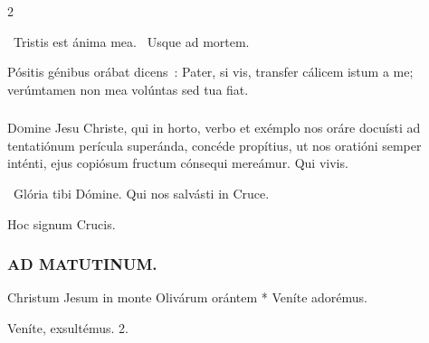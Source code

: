 \documentclass[9pt,twoside]{extarticle}
\begin{document}
\begin{multicols}{2}
\begin{tightlist}{}
\item {}~Tristis est ánima mea. ~Usque ad mortem.
\item {} Pósitis génibus orábat dicens~: Pater, si vis, transfer cálicem istum a me; verúmtamen non mea volúntas sed tua fiat.
\end{tightlist}

\subsubsection*{\center {}}
\lettrine{D}omine Jesu Christe, qui in horto, verbo et exémplo nos oráre docuísti ad tentatiónum perícula superánda, concéde propítius, ut nos oratióni semper inténti, ejus copiósum fructum cónsequi mereámur. Qui vivis.

\begin{tightlist}{}
\item {}~Glória tibi Dómine. Qui nos salvásti in Cruce.
\item {} Hoc signum Crucis.
\end{tightlist}

\subsubsection*{\center \textsc{AD MATUTINUM.}}
\begin{tightlist}{}
\item {} Christum Jesum in monte Olivárum orántem * Veníte adorémus.
\item {} Veníte, exsultémus. 2.
\item {}
\end{tightlist}


\end{multicols}
\end{document}
